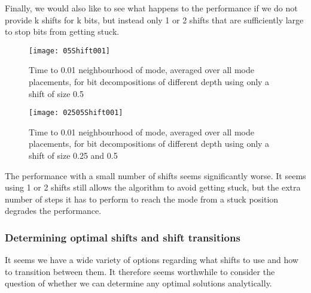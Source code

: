 Finally, we would also like to see what happens to the performance if we do not provide k shifts for k bits, but instead only 1 or 2 shifts that are sufficiently large to stop bits from getting stuck. 

\begin{figure}[H]
    \centering
    \texttt{[image: 05Shift001]}
    \caption{Time to 0.01 neighbourhood of mode, averaged over all mode placements, for bit decompositions of different depth using only a shift of size 0.5}
    \label{fig:05Shift001}
\end{figure}

\begin{figure}[H]
    \centering
    \texttt{[image: 02505Shift001]}
    \caption{Time to 0.01 neighbourhood of mode, averaged over all mode placements, for bit decompositions of different depth using only a shift of size 0.25 and 0.5}
    \label{fig:02505Shift001}
\end{figure}

The performance with a small number of shifts seems significantly worse. It seems using 1 or 2 shifts still allows the algorithm to avoid getting stuck, but the extra number of steps it has to perform to reach the mode from a stuck position degrades the performance.

\subsubsection{Determining optimal shifts and shift transitions}
It seems we have a wide variety of options regarding what shifts to use and how to transition between them. It therefore seems worthwhile to consider the question of whether we can determine any optimal solutions analytically. 

